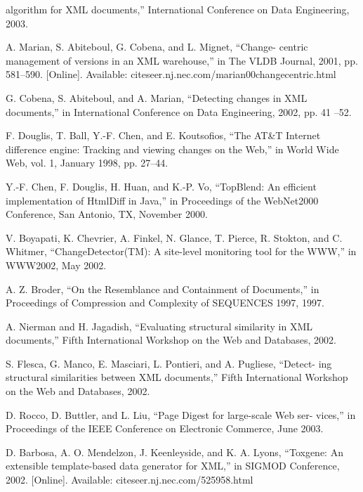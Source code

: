 \begin{enumerate}[{[}1{]}]
  algorithm for XML documents,” International Conference on Data Engineering,
  2003.
\item A. Marian, S. Abiteboul, G. Cobena, and L. Mignet, “Change- centric
  management of versions in an XML warehouse,” in The VLDB Journal, 2001, pp.
  581–590. [Online]. Available: citeseer.nj.nec.com/marian00changecentric.html
\item G. Cobena, S. Abiteboul, and A. Marian, “Detecting changes in XML
  documents,” in International Conference on Data Engineering, 2002, pp. 41
  –52.
\item F. Douglis, T. Ball, Y.-F. Chen, and E. Koutsofios, “The AT\&T Internet
  difference engine: Tracking and viewing changes on the Web,” in World Wide
  Web, vol. 1, January 1998, pp. 27–44.
\item Y.-F. Chen, F. Douglis, H. Huan, and K.-P. Vo, “TopBlend: An efficient
  implementation of HtmlDiff in Java,” in Proceedings of the WebNet2000
  Conference, San Antonio, TX, November 2000.
\item V. Boyapati, K. Chevrier, A. Finkel, N. Glance, T. Pierce, R. Stokton, and
  C. Whitmer, “ChangeDetector(TM): A site-level monitoring tool for the WWW,”
  in WWW2002, May 2002.
\item A. Z. Broder, “On the Resemblance and Containment of Documents,” in
  Proceedings of Compression and Complexity of SEQUENCES 1997, 1997.
\item A. Nierman and H. Jagadish, “Evaluating structural similarity in XML
  documents,” Fifth International Workshop on the Web and Databases, 2002.
\item S. Flesca, G. Manco, E. Masciari, L. Pontieri, and A. Pugliese, “Detect-
  ing structural similarities between XML documents,” Fifth International
  Workshop on the Web and Databases, 2002.
\item D. Rocco, D. Buttler, and L. Liu, “Page Digest for large-scale Web ser-
  vices,” in Proceedings of the IEEE Conference on Electronic Commerce, June
  2003.
\item D. Barbosa, A. O. Mendelzon, J. Keenleyside, and K. A. Lyons, “Toxgene:
  An extensible template-based data generator for XML,” in SIGMOD Conference,
  2002. [Online]. Available: citeseer.nj.nec.com/525958.html
\end{enumerate}
